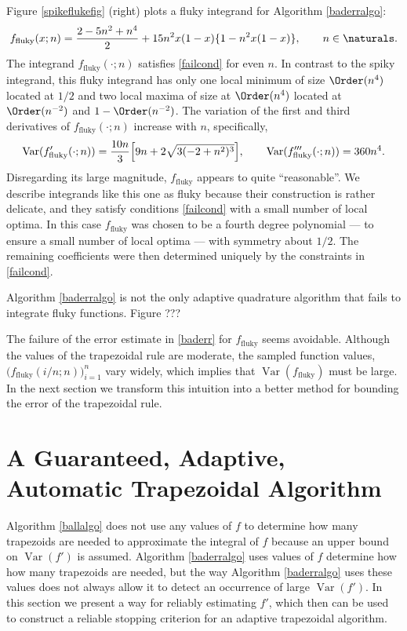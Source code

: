 \documentclass[]{article}
\DeclareMathOperator{\Var}{Var}
\theoremstyle{definition}
\theoremstyle{remark}
\begin{document}
Figure \ref{spikeflukefig} (right) plots a fluky integrand for Algorithm \ref{baderralgo}:
\begin{equation} \label{fluky}
f_{\text{fluky}}(x;n) = \frac{2 - 5 n^2 + n^4}{2}+ 15n^2 x(1-x)\{1 - n^2 x(1-x)\}, \qquad n \in \naturals.
\end{equation}
The integrand $f_{\text{fluky}}(\cdot;n)$ satisfies \eqref{failcond} for even $n$.   In contrast to the spiky integrand, this fluky integrand has only one local minimum of size $\Order(n^4)$ located at $1/2$ and two local maxima of size at $\Order(n^4)$ located at $\Order(n^{-2})$ and $1-\Order(n^{-2})$.  The variation of the first and third derivatives of $f_{\text{fluky}}(\cdot;n)$ increase with $n$, specifically,
\begin{equation*}
\Var(f'_{\text{fluky}}(\cdot;n))= \frac{10 n}{3}  \Bigl[9 n + 2 \sqrt{3(-2 + n^2)^3} \Bigr ], \qquad
\Var(f'''_{\text{fluky}}(\cdot;n))= 360n^4.
\end{equation*}
Disregarding its large magnitude, $f_{\text{fluky}}$ appears to quite ``reasonable''.  We describe integrands like this one as fluky because their construction is rather delicate, and they satisfy conditions \eqref{failcond} with a small number of local optima.  In this case $f_{\text{fluky}}$ was chosen to be a fourth degree polynomial --- to ensure a small number of local optima --- with symmetry about $1/2$.  The remaining coefficients were then determined uniquely by the constraints in \eqref{failcond}.  

Algorithm \ref{baderralgo} is not the only adaptive quadrature algorithm that fails to integrate fluky functions.  Figure ??? 

The failure of the error estimate in \eqref{baderr} for $f_{\text{fluky}}$ seems avoidable. Although the values of the trapezoidal rule are moderate, the sampled function values, $\bigl(f_{\text{fluky}}(i/n;n)\bigr)_{i=1}^{n}$ vary widely, which implies that $\Var(f_{\text{fluky}})$ must be large.  In the next section we transform this intuition into a better method for bounding the error of the trapezoidal rule.


\section{A Guaranteed, Adaptive, Automatic Trapezoidal Algorithm} \label{newalgosec}

Algorithm \ref{ballalgo} does not use any values of $f$ to determine how many trapezoids are needed to approximate the integral of $f$ because an upper bound on $\Var(f')$ is assumed.  Algorithm \ref{baderralgo} uses values of $f$ determine how how many trapezoids are needed, but the way Algorithm \ref{baderralgo} uses these values does not always allow it to detect an occurrence of large $\Var(f')$.  In this section we present a way for reliably estimating $f'$, which then can be used to construct a reliable stopping criterion for an adaptive trapezoidal algorithm.
\end{document}
